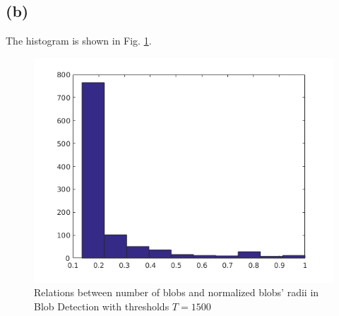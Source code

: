 \documentclass[letterpaper]{article}
\begin{document}
\subsection*{(b)}
The histogram is shown in Fig. \ref{q25}.
\begin{figure}[H]
\centering
\includegraphics[scale=0.8]{q21500.png}
\caption{Relations between number of blobs and normalized blobs' radii in Blob Detection with thresholds $T = 1500$}
\label{q25}
\end{figure}

\end{document}
